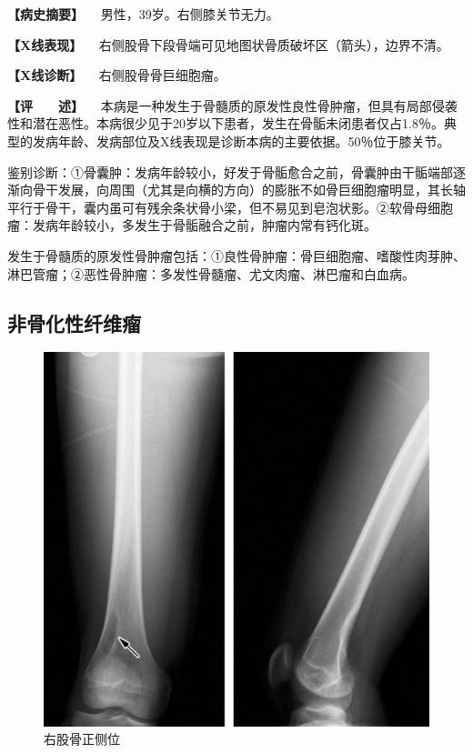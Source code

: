 \textbf{【病史摘要】} 　男性，39岁。右侧膝关节无力。

\textbf{【X线表现】}
　右侧股骨下段骨端可见地图状骨质破坏区（箭头），边界不清。

\textbf{【X线诊断】} 　右侧股骨骨巨细胞瘤。

\textbf{【评　　述】}
　本病是一种发生于骨髓质的原发性良性骨肿瘤，但具有局部侵袭性和潜在恶性。本病很少见于20岁以下患者，发生在骨骺未闭患者仅占1.8％。典型的发病年龄、发病部位及X线表现是诊断本病的主要依据。50％位于膝关节。

鉴别诊断：①骨囊肿：发病年龄较小，好发于骨骺愈合之前，骨囊肿由干骺端部逐渐向骨干发展，向周围（尤其是向横的方向）的膨胀不如骨巨细胞瘤明显，其长轴平行于骨干，囊内虽可有残余条状骨小梁，但不易见到皂泡状影。②软骨母细胞瘤：发病年龄较小，多发生于骨骺融合之前，肿瘤内常有钙化斑。

发生于骨髓质的原发性骨肿瘤包括：①良性骨肿瘤：骨巨细胞瘤、嗜酸性肉芽肿、淋巴管瘤；②恶性骨肿瘤：多发性骨髓瘤、尤文肉瘤、淋巴瘤和白血病。

\subsection{非骨化性纤维瘤}

\begin{figure}[!htbp]
 \centering
 \includegraphics{./images/Image00096.jpg}
 \captionsetup{justification=centering}
 \caption{右股骨正侧位}
 \label{fig2-7-11}
  \end{figure} 

